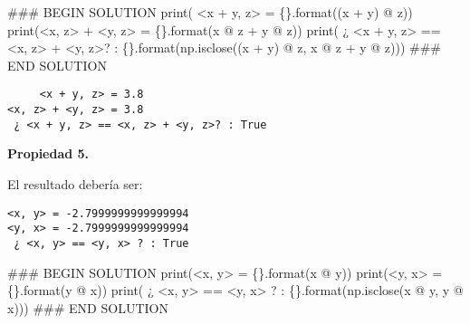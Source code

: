 \documentclass[
  letterpaper,
  DIV=11,
  numbers=noendperiod]{scrreprt}
\newenvironment{Shaded}{\begin{snugshade}}{\end{snugshade}}
\newcommand{\BuiltInTok}[1]{\textcolor[rgb]{0.00,0.23,0.31}{#1}}
\newcommand{\CommentTok}[1]{\textcolor[rgb]{0.37,0.37,0.37}{#1}}
\newcommand{\NormalTok}[1]{\textcolor[rgb]{0.00,0.23,0.31}{#1}}
\newcommand{\OperatorTok}[1]{\textcolor[rgb]{0.37,0.37,0.37}{#1}}
\newcommand{\RegionMarkerTok}[1]{\textcolor[rgb]{0.00,0.23,0.31}{#1}}
\newcommand{\SpecialCharTok}[1]{\textcolor[rgb]{0.37,0.37,0.37}{#1}}
\newcommand{\StringTok}[1]{\textcolor[rgb]{0.13,0.47,0.30}{#1}}
\begin{document}
\begin{Shaded}
\begin{Highlighting}[]
\CommentTok{\#\#\# }\RegionMarkerTok{BEGIN}\CommentTok{ SOLUTION}
\BuiltInTok{print}\NormalTok{(}\StringTok{\textquotesingle{}     \textless{}x + y, z\textgreater{} = }\SpecialCharTok{\{\}}\StringTok{\textquotesingle{}}\NormalTok{.}\BuiltInTok{format}\NormalTok{((x }\OperatorTok{+}\NormalTok{ y) }\OperatorTok{@}\NormalTok{ z))}
\BuiltInTok{print}\NormalTok{(}\StringTok{\textquotesingle{}\textless{}x, z\textgreater{} + \textless{}y, z\textgreater{} = }\SpecialCharTok{\{\}}\StringTok{\textquotesingle{}}\NormalTok{.}\BuiltInTok{format}\NormalTok{(x }\OperatorTok{@}\NormalTok{ z }\OperatorTok{+}\NormalTok{ y }\OperatorTok{@}\NormalTok{ z))}
\BuiltInTok{print}\NormalTok{(}\StringTok{\textquotesingle{} ¿ \textless{}x + y, z\textgreater{} == \textless{}x, z\textgreater{} + \textless{}y, z\textgreater{}? : }\SpecialCharTok{\{\}}\StringTok{\textquotesingle{}}\NormalTok{.}\BuiltInTok{format}\NormalTok{(np.isclose((x }\OperatorTok{+}\NormalTok{ y) }\OperatorTok{@}\NormalTok{ z, x }\OperatorTok{@}\NormalTok{ z }\OperatorTok{+}\NormalTok{ y }\OperatorTok{@}\NormalTok{ z)))}
\CommentTok{\#\#\# }\RegionMarkerTok{END}\CommentTok{ SOLUTION}
\end{Highlighting}
\end{Shaded}

\begin{verbatim}
     <x + y, z> = 3.8
<x, z> + <y, z> = 3.8
 ¿ <x + y, z> == <x, z> + <y, z>? : True
\end{verbatim}

\textbf{Propiedad 5.}

El resultado debería ser:

\begin{verbatim}
<x, y> = -2.7999999999999994
<y, x> = -2.7999999999999994
 ¿ <x, y> == <y, x> ? : True
\end{verbatim}

\begin{Shaded}
\begin{Highlighting}[]
\CommentTok{\#\#\# }\RegionMarkerTok{BEGIN}\CommentTok{ SOLUTION}
\BuiltInTok{print}\NormalTok{(}\StringTok{\textquotesingle{}\textless{}x, y\textgreater{} = }\SpecialCharTok{\{\}}\StringTok{\textquotesingle{}}\NormalTok{.}\BuiltInTok{format}\NormalTok{(x }\OperatorTok{@}\NormalTok{ y))}
\BuiltInTok{print}\NormalTok{(}\StringTok{\textquotesingle{}\textless{}y, x\textgreater{} = }\SpecialCharTok{\{\}}\StringTok{\textquotesingle{}}\NormalTok{.}\BuiltInTok{format}\NormalTok{(y }\OperatorTok{@}\NormalTok{ x))}
\BuiltInTok{print}\NormalTok{(}\StringTok{\textquotesingle{} ¿ \textless{}x, y\textgreater{} == \textless{}y, x\textgreater{} ? : }\SpecialCharTok{\{\}}\StringTok{\textquotesingle{}}\NormalTok{.}\BuiltInTok{format}\NormalTok{(np.isclose(x }\OperatorTok{@}\NormalTok{ y, y }\OperatorTok{@}\NormalTok{ x)))}
\CommentTok{\#\#\# }\RegionMarkerTok{END}\CommentTok{ SOLUTION}
\end{Highlighting}
\end{Shaded}
\end{document}
